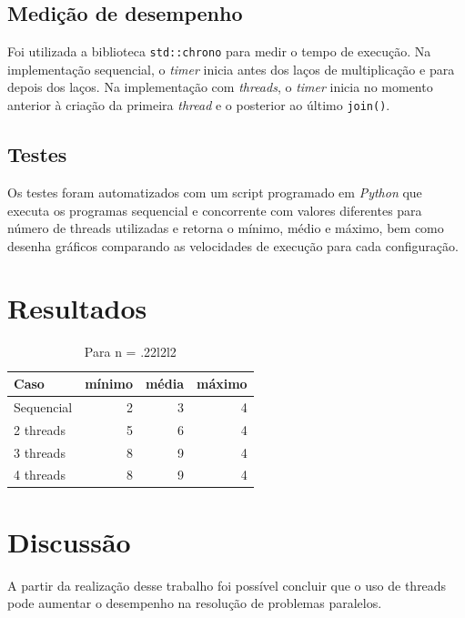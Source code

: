\documentclass[12pt, a4paper]{article}
\newcommand{\code}[1]{{\lstinline{#1}}}
\begin{document}
\subsection{Medição de desempenho}
Foi utilizada a biblioteca \code{std::chrono} para medir o tempo de execução.
Na implementação sequencial, o \emph{timer} inicia antes dos laços de
multiplicação e para depois dos laços. Na implementação com \emph{threads}, o
\emph{timer} inicia no momento anterior à criação da primeira \emph{thread} e o
posterior ao último \code{join()}.

\subsection{Testes}
Os testes foram automatizados com um script programado em \emph{Python} que
executa os programas sequencial e concorrente com valores diferentes para
número de threads utilizadas e retorna o mínimo, médio e máximo, bem como
desenha gráficos comparando as velocidades de execução para cada configuração.

\section{Resultados}
\begin{table}[h]\footnotesize
    \centering
    \begin{tabular}{ l | r r r }
        Caso      & mínimo & média & máximo \\
        \hline
        Sequencial & 2 & 3 & 4 \\
        2 threads  & 5 & 6 & 4 \\
        3 threads  & 8 & 9 & 4 \\
        4 threads  & 8 & 9 & 4 \\
    \end{tabular}
  \caption{Para n = .22l2l2}
\end{table}

\section{Discussão}
A partir da realização desse trabalho foi possível concluir que o uso de
threads pode aumentar o desempenho na resolução de problemas paralelos.
\end{document}
